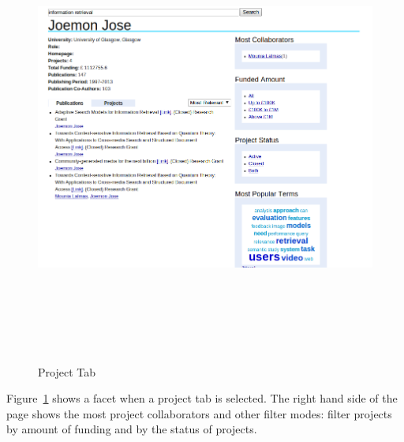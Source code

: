 \begin{figure}
\centering
\includegraphics[width=13cm,height=15cm,keepaspectratio]{./figures/newPofilePageProject.png}
\caption{Project Tab} \label{fig:newPofilePageProject} 
\end{figure}
Figure~\ref{fig:newPofilePageProject} shows a facet when a project tab is selected. The right hand side of the page shows the most project collaborators
and other filter modes: filter projects by amount of funding and by the status of projects.

